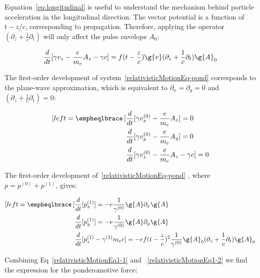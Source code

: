\noindent  Equation~\ref{eq:longitudinal} is useful to understand the mechanism behind particle acceleration in the longitudinal direction. The vector potential is a function of $t - z/c$, corresponding to propagation. Therefore, applying the operator $(\partial_z  + \frac{1}{c}\partial_t)$ will only affect the pulse envelope $A_0$:

$$
\frac{d}{dt}[\gamma v_z - \frac{e}{m_e}A_z-\gamma c] = f(t-\frac{z}{c})\g{v}(\partial_z  + \frac{1}{c}\partial_t)\g{A}_0
$$


\noindent The first-order development of system~\ref{relativisticMotionEq-pond} corresponds to the plane-wave approximation, which is equivalent to $\partial_x = \partial_y = 0$ and $(\partial_z  + \frac{1}{c}\partial_t) = 0$:

\begin{subequations}
\label{relativisticMotionEq0}
\begin{align}[left = \empheqlbrace\,]
&\frac{d}{dt}[\gamma v_x^{(0)} - \frac{e}{m_e}A_x] = 0 \label{relativisticMotionEq0-1} \\
&\frac{d}{dt}[\gamma v_y^{(0)} - \frac{e}{m_e}A_y] = 0 \label{relativisticMotionEq0-2} \\
&\frac{d}{dt}[\gamma v_z^{(0)}-\frac{e}{m_e}A_z -\gamma c] = 0 \label{relativisticMotionEq0-3} 
\end{align}
\end{subequations}

\noindent The first-order development of~\ref{relativisticMotionEq-pond} , where $p=p^{(0)} + p^{(1)}$, gives:

\begin{subequations}
\label{relativisticMotionEq1}
\begin{align}[left = \empheqlbrace\,]
&\frac{d}{dt}[p_x^{(1)} ] = - e\frac{1}{\gamma^{(0)}}\g{A}\partial_x \g{A} \label{relativisticMotionEq1-1} \\
&\frac{d}{dt}[p_y^{(1)}] = - e\frac{1}{\gamma^{(0)}}\g{A}\partial_y \g{A}  \label{relativisticMotionEq1-2} \\
&\frac{d}{dt}[p_z^{(1)}-\gamma^{(1)}m_e c] = -e f(t-\frac{z}{c})^2\frac{1}{\gamma^{(0)}}\g{A}_0(\partial_z  + \frac{1}{c}\partial_t)\g{A}_0\label{relativisticMotionEq1-3} 
\end{align}
\end{subequations}

\noindent Combining Eq~\ref{relativisticMotionEq1-1} and ~\ref{relativisticMotionEq1-2} we find the expression for the ponderomotive force:

